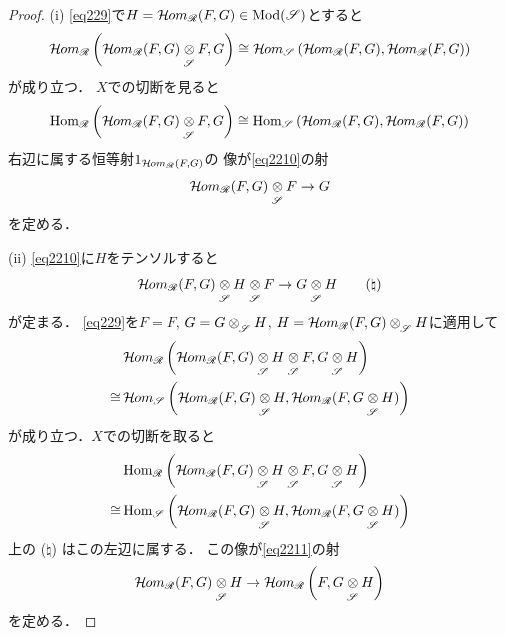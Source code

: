 \begin{proof}
    (i) 
    \eqref{eq229}で\(H=\mathop{\mathcal{H}\hspace{-0.5pt}om}\nolimits_{\mathscr{R}}(F,G)\in\mathop{\mathrm{Mod}}\nolimits(\mathscr{S})\)とすると
    \[
        \HOM_{\scR}\left(\HOM_{\scR}(F,G)\ttens[\scS]F,G\right)
        \cong
        \HOM_{\scS}\left(\HOM_{\scR}(F,G),\HOM_{\scR}(F,G)\right)
    \]
    が成り立つ．
    \(X\)での切断を見ると
    \[
        \Hom_{\scR}\left(\HOM_{\scR}(F,G)\ttens[\scS]F,G\right)
        \cong
        \Hom_{\scS}\left(\HOM_{\scR}(F,G),\HOM_{\scR}(F,G)\right)
    \]
    右辺に属する恒等射\(1_{\mathop{\mathcal{H}\hspace{-0.5pt}om}\nolimits_{\mathscr{R}}(F,G)}\)の
    像が\eqref{eq2210}の射\[
        \HOM_{\scR}(F,G)\ttens[\scS]F\to G
    \]を定める．

    (ii) 
    \eqref{eq2210}に\(H\)をテンソルすると
    \[
        \HOM_{\scR}(F,G)\ttens[\scS]H\ttens[\scS]F\to G\ttens[\scS]H\tag*{(\(\natural\))}
    \]
    が定まる．
    \eqref{eq229}を\(F=F\), \(G=G\ttens[\scS]H\), 
    \(H=\HOM_{\scR}(F,G)\ttens[\scS]H\)に適用して
    \begin{align*}
        &\HOM_{\scR}\left(\HOM_{\scR}(F,G)\ttens[\scS]H\ttens[\scS]F,G\ttens[\scS]H\right)\\
        \cong
        &\HOM_{\scS}\left(\HOM_{\scR}(F,G)\ttens[\scS]H,\HOM_{\scR}(F,G\ttens[\scS]H)\right)
    \end{align*}
    が成り立つ．\(X\)での切断を取ると
    \begin{align*}
        &\Hom_{\scR}\left(\HOM_{\scR}(F,G)\ttens[\scS]H\ttens[\scS]F,G\ttens[\scS]H\right)\\
        \cong
        &\Hom_{\scS}\left(\HOM_{\scR}(F,G)\ttens[\scS]H,\HOM_{\scR}(F,G\ttens[\scS]H)\right)
    \end{align*}
    上の (\(\natural\)) はこの左辺に属する．
    この像が\eqref{eq2211}の射\[
        \HOM_{\scR}(F,G)\ttens[\scS]H
        \to
        \HOM_{\scR}\left(F,G\ttens[\scS]H\right)
    \]
    を定める．


\end{proof}
